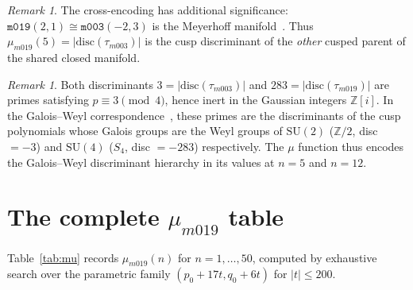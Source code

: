 \documentclass[11pt,a4paper]{article}
\theoremstyle{definition}
\theoremstyle{remark}
\newtheorem{remark}[theorem]{Remark}
\newcommand{\Z}{\mathbb{Z}}
\newcommand{\mfld}[1]{\texttt{#1}}
\newcommand{\SU}{\mathrm{SU}}
\begin{document}
\begin{remark}
The cross-encoding has additional significance:
$\mfld{m019}(2,1) \cong \mfld{m003}(-2,3)$ is the
Meyerhoff manifold~\cite{GentryDual}.
Thus $\mu_{m019}(5) = |\mathrm{disc}(\tau_{m003})|$
is the cusp discriminant of the \emph{other} cusped parent
of the shared closed manifold.
\end{remark}

\begin{remark}
Both discriminants $3 = |\mathrm{disc}(\tau_{m003})|$
and $283 = |\mathrm{disc}(\tau_{m019})|$ are primes
satisfying $p \equiv 3 \pmod{4}$, hence inert in the
Gaussian integers $\Z[i]$.
In the Galois--Weyl correspondence~\cite{GentryGalois},
these primes are the discriminants of the cusp polynomials
whose Galois groups are the Weyl groups of $\SU(2)$
($\Z/2$, disc $= -3$) and $\SU(4)$
($S_4$, disc $= -283$) respectively.
The $\mu$ function thus encodes the Galois--Weyl
discriminant hierarchy in its values at $n = 5$ and $n = 12$.
\end{remark}

\section{The complete $\mu_{m019}$ table}

Table~\ref{tab:mu} records $\mu_{m019}(n)$ for $n=1,\ldots,50$,
computed by exhaustive search over the parametric family
$(p_0+17t, q_0+6t)$ for $|t|\leq 200$.
\end{document}
